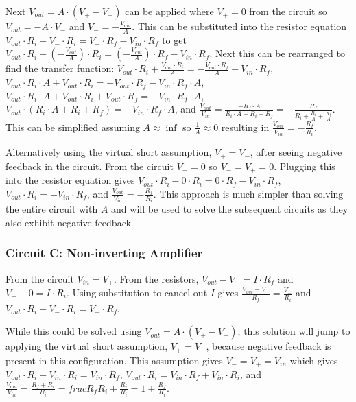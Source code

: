 \documentclass[main.tex]{subfiles}
\begin{document}
Next $V_{out} = A \cdot (V_{+} - V_{-})$ can be applied where $V_{+} = 0$ from the circuit so $V_{out} = -A \cdot V_{-}$ and $V_{-} = -\frac{V_{out}}{A}$. This can be substituted into the resistor equation $V_{out} \cdot R_i - V_{-} \cdot R_i = V_{-} \cdot R_f - V_{in} \cdot R_f$ to get $V_{out} \cdot R_i - (-\frac{V_{out}}{A}) \cdot R_i = (-\frac{V_{out}}{A}) \cdot R_f - V_{in} \cdot R_f$. Next this can be rearranged to find the transfer function: $V_{out} \cdot R_i + \frac{V_{out} \cdot R_i}{A} = -\frac{V_{out} \cdot R_f}{A} - V_{in} \cdot R_f$, $V_{out} \cdot R_i \cdot A + V_{out} \cdot R_i = -V_{out} \cdot R_f - V_{in} \cdot R_f \cdot A$, $V_{out} \cdot R_i \cdot A + V_{out} \cdot R_i + V_{out} \cdot R_f = - V_{in} \cdot R_f \cdot A$, $V_{out} \cdot (R_i \cdot A + R_i + R_f) = - V_{in} \cdot R_f \cdot A$, and $\frac{V_{out}}{V_{in}} = \frac{-R_f \cdot A}{R_i \cdot A + R_i + R_f} = -\frac{R_f}{R_i + \frac{R_i}{A} + \frac{R_f}{A}}$. This can be simplified assuming $A \approx \inf$ so $\frac{1}{A} \approx 0$ resulting in $\frac{V_{out}}{V_{in}} = -\frac{R_f}{R_i}$. 

Alternatively using the virtual short assumption, $V_{+} = V_{-}$, after seeing negative feedback in the circuit. From the circuit $V_{+} = 0$ so $V_{-} = V_{+} = 0$. Plugging this into the resistor equation gives $V_{out} \cdot R_i - 0 \cdot R_i = 0 \cdot R_f - V_{in} \cdot R_f$, $V_{out} \cdot R_i = - V_{in} \cdot R_f$, and $\frac{V_{out}}{V_{in}} = -\frac{R_f}{R_i}$. This approach is much simpler than solving the entire circuit with $A$ and will be used to solve the subsequent circuits as they also exhibit negative feedback.  

\subsubsection{Circuit C: Non-inverting Amplifier}
From the circuit $V_{in} = V_{+}$. From the resistors, $V_{out} - V_{-} = I \cdot R_f$ and $V_{-} - 0 = I \cdot R_i$. Using substitution to cancel out $I$ gives $\frac{V_{out} - V_{-}}{R_f} = \frac{V_{-}}{R_i}$ and $V_{out} \cdot R_i - V_{-} \cdot R_i = V_{-} \cdot R_f$.

While this could be solved using $V_{out} = A \cdot (V_{+} - V_{-})$, this solution will jump to applying the virtual short assumption, $V_{+} = V_{-}$, because negative feedback is present in this configuration. This assumption gives $V_{-} = V_{+} = V_{in}$ which gives $V_{out} \cdot R_i - V_{in} \cdot R_i = V_{in} \cdot R_f$, $V_{out} \cdot R_i = V_{in} \cdot R_f + V_{in} \cdot R_i$, and $\frac{V_{out}}{V_{in}} = \frac{R_f + R_i}{R_i} = frac{R_f}{R_i} + \frac{R_i}{R_i} = 1 + \frac{R_f}{R_i}$. 
\end{document}
